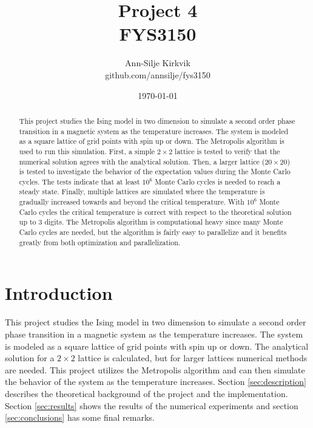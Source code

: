 \documentclass{article}
\begin{document}
\title{\vspace{1cm}Project 4 \\ FYS3150}

\author{\vspace{1cm}Ann-Silje Kirkvik \\ github.com/annsilje/fys3150}
\date{\vspace{5cm}\today}

\maketitle

\newpage

\begin{abstract}
This project studies the Ising model in two dimension to simulate a second order phase transition in a magnetic system as the temperature increases. The system is modeled as a square lattice of grid points with spin up or down. The Metropolis algorithm is used to run this simulation. First, a simple $2\times 2$ lattice is tested to verify that the numerical solution agrees with the analytical solution. Then, a larger lattice ($20 \times 20$) is tested to investigate the behavior of the expectation values during the Monte Carlo cycles. The tests indicate that at least $10^6$ Monte Carlo cycles is needed to reach a steady state. Finally, multiple lattices are simulated where the temperature is gradually increased towards and beyond the critical temperature. With $10^6$ Monte Carlo cycles the critical temperature is correct with respect to the theoretical solution up to 3 digits. The Metropolis algorithm is computational heavy since many Monte Carlo cycles are needed, but the algorithm is fairly easy to parallelize and it benefits greatly from both optimization and parallelization.
\end{abstract}

\vspace{1cm}


\section{Introduction}
This project studies the Ising model in two dimension to simulate a second order phase transition in a magnetic system as the temperature increases. The system is modeled as a square lattice of grid points with spin up or down. The analytical solution for a $2\times 2$ lattice is calculated, but for larger lattices numerical methods are needed. This project utilizes the Metropolis algorithm and can then simulate the behavior of the system as the temperature increases. Section \ref{sec:description} describes the theoretical background of the project and the implementation. Section \ref{sec:results} shows the results of the numerical experiments and section \ref{sec:conclusions} has some final remarks.
\end{document}
